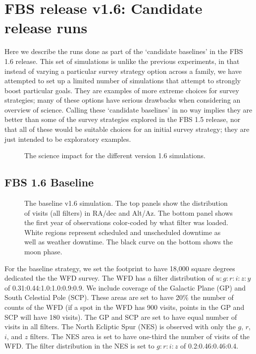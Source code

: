 \section{FBS release v1.6: Candidate release runs}\label{sec:1.6}

Here we describe the runs done as part of the `candidate baselines' in the FBS 1.6 release.  This set of simulations is unlike the previous experiments, in that instead of varying a particular survey strategy option across a family, we have attempted to set up a limited number of simulations that attempt to strongly boost particular goals. They are examples of more extreme choices for survey strategies; many of these options have serious drawbacks when considering an overview of science. Calling these `candidate baselines' in no way implies they are better than some of the survey strategies explored in the FBS 1.5 release, nor that all of these would be suitable choices for an initial survey strategy; they are just intended to be exploratory examples. 

\begin{figure}
\caption{The science impact for the different version 1.6 simulations.}\label{fig:v16radar}
\end{figure}

\subsection{FBS 1.6 Baseline}\label{ss:1.6baseline}

\begin{figure}
\caption{The baseline v1.6 simulation. The top panels show the distribution of visits (all filters) in RA/dec and Alt/Az. The bottom panel shows the first year of observations color-coded by what filter was loaded. White regions represent scheduled and unscheduled downtime as well as weather downtime. The black curve on the bottom shows the moon phase.}\label{fig:baseline1.6}
\end{figure}


For the baseline strategy, we set the footprint to have 18,000 square degrees dedicated the the WFD survey. The WFD has a filter distribution of $u:g:r:i:z:y$ of 0.31:0.44:1.0:1.0:0.9:0.9. 
We include coverage of the Galactic Plane (GP) and South Celestial Pole (SCP). These areas are set to have 20\% the number of counts of the WFD (if a spot in the WFD has 900 visits, points in the GP and SCP will have 180 visits). The GP and SCP are set to have equal number of visits in all filters.  The North Ecliptic Spur (NES) is observed with only the $g$, $r$, $i$, and $z$ filters. The NES area is set to have one-third the number of visits of the WFD.  The filter distribution in the NES is set to $g:r:i:z$ of 0.2:0.46:0.46:0.4. 

